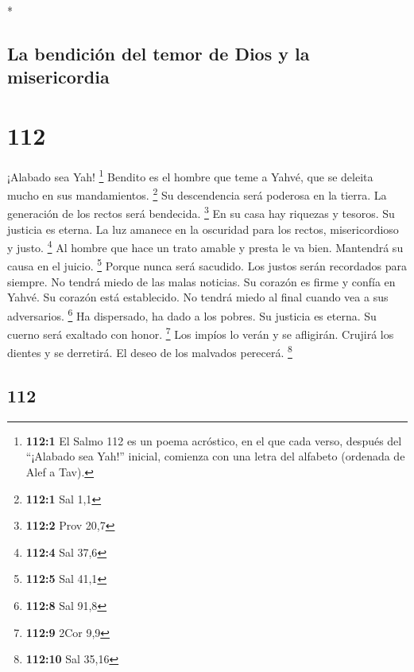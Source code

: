 \begin{paracol}{2}
\begin{otherlanguage}{english}
\end{otherlanguage}

\switchcolumn[0]*

\hypertarget{la-bendiciuxf3n-del-temor-de-dios-y-la-misericordia}{%
\subsection{La bendición del temor de Dios y la
misericordia}\label{la-bendiciuxf3n-del-temor-de-dios-y-la-misericordia}}

\hypertarget{section-222}{%
\section{112}\label{section-222}}

 ¡Alabado sea Yah! \footnote{\textbf{112:1} El Salmo 112
  es un poema acróstico, en el que cada verso, después del ``¡Alabado
  sea Yah!'' inicial, comienza con una letra del alfabeto (ordenada de
  Alef a Tav).} Bendito es el hombre que teme a Yahvé, que se deleita
mucho en sus mandamientos. \footnote{\textbf{112:1} Sal 1,1}
 Su descendencia será poderosa en la tierra. La generación
de los rectos será bendecida. \footnote{\textbf{112:2} Prov 20,7}
 En su casa hay riquezas y tesoros. Su justicia es eterna.
 La luz amanece en la oscuridad para los rectos,
misericordioso y justo. \footnote{\textbf{112:4} Sal 37,6}
 Al hombre que hace un trato amable y presta le va bien.
Mantendrá su causa en el juicio. \footnote{\textbf{112:5} Sal 41,1}
 Porque nunca será sacudido. Los justos serán recordados
para siempre.  No tendrá miedo de las malas noticias. Su
corazón es firme y confía en Yahvé.  Su corazón está
establecido. No tendrá miedo al final cuando vea a sus adversarios.
\footnote{\textbf{112:8} Sal 91,8}  Ha dispersado, ha dado
a los pobres. Su justicia es eterna. Su cuerno será exaltado con honor.
\footnote{\textbf{112:9} 2Cor 9,9}  Los impíos lo verán y
se afligirán. Crujirá los dientes y se derretirá. El deseo de los
malvados perecerá. \footnote{\textbf{112:10} Sal 35,16}

\switchcolumn
\begin{otherlanguage}{english}

\hypertarget{section-223}{%
\section{112}\label{section-223}}


\end{otherlanguage}
\end{paracol}
